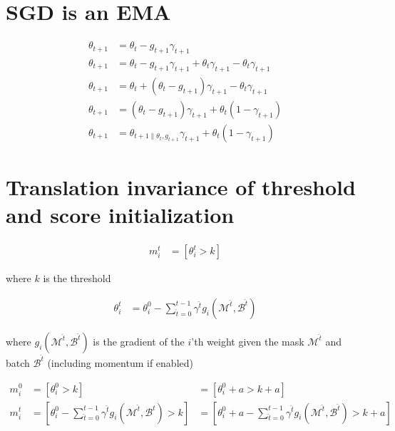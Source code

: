 \documentclass[12pt]{report}
\begin{document}
    \section{SGD is an EMA}

    \begin{align}
        \label{eq:ema}
        \theta_{t+1} &= \theta_{t} - g_{t+1}\gamma_{t+1}\\
        \theta_{t+1} &= \theta_{t} - g_{t+1}\gamma_{t+1} + \theta_t\gamma_{t+1} - \theta_t\gamma_{t+1}\\
        \theta_{t+1} &= \theta_{t} + (\theta_t - g_{t+1})\gamma_{t+1} - \theta_t\gamma_{t+1}\\
        \theta_{t+1} &= (\theta_t - g_{t+1})\gamma_{t+1} + \theta_t(1 - \gamma_{t+1})\\
        \theta_{t+1} &= \theta_{t+1\|\theta_t,g_{t+1}} \gamma_{t+1} + \theta_{t}(1-\gamma_{t+1})
    \end{align}


    \section{Translation invariance of threshold and score initialization}

    \begin{align}
        m_i^t &= [\theta_i^t > k]
    \end{align}

    where $k$ is the threshold

    \begin{align}
        \theta_i^{t} &= \theta_i^0 - \sum_{\hat t=0}^{t-1} \gamma^{\hat t} g_{i}(\mathcal{M}^{\hat t}, \mathcal{B}^{\hat t})
    \end{align}

    where $g_{i}(\mathcal{M}^{\hat t}, \mathcal{B}^{\hat t})$ is the gradient of the $i$'th weight given the mask $\mathcal{M}^{\hat t}$ and batch $\mathcal{B}^{\hat t}$ (including momentum if enabled)

    \begin{align}
        m_i^0 &= [\theta_i^0 > k] &= [\theta_i^0 + a > k + a] \\
        m_i^{t} &= [\theta_i^0 - \sum_{\hat t=0}^{t-1} \gamma^{\hat t} g_{i}(\mathcal{M}^{\hat t}, \mathcal{B}^{\hat t}) > k] &= [\theta_i^0 + a - \sum_{\hat t=0}^{t-1} \gamma^{\hat t} g_{i}(\mathcal{M}^{\hat t}, \mathcal{B}^{\hat t}) > k + a]\label{eq:recur}
    \end{align}
\end{document}
